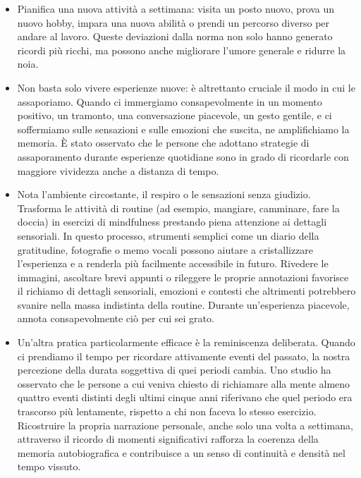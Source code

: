 \documentclass[12pt]{book} %
\begin{document}
\begin{itemize}
\item Pianifica una nuova attività a settimana: visita un posto nuovo, prova un nuovo hobby, impara una nuova abilità o prendi un percorso diverso per andare al lavoro. Queste deviazioni dalla norma non solo hanno generato ricordi più ricchi, ma possono anche migliorare l’umore generale e ridurre la noia.
\item Non basta solo vivere esperienze nuove: è altrettanto cruciale il modo in cui le assaporiamo. Quando ci immergiamo consapevolmente in un momento positivo, un tramonto, una conversazione piacevole, un gesto gentile, e ci soffermiamo sulle sensazioni e sulle emozioni che suscita, ne amplifichiamo la memoria. È stato osservato che le persone che adottano strategie di assaporamento durante esperienze quotidiane sono in grado di ricordarle con maggiore vividezza anche a distanza di tempo. 
\item Nota l'ambiente circostante, il respiro o le sensazioni senza giudizio. Trasforma le attività di routine (ad esempio, mangiare, camminare, fare la doccia) in esercizi di mindfulness prestando piena attenzione ai dettagli sensoriali. In questo processo, strumenti semplici come un diario della gratitudine, fotografie o memo vocali possono aiutare a cristallizzare l’esperienza e a renderla più facilmente accessibile in futuro. Rivedere le immagini, ascoltare brevi appunti o rileggere le proprie annotazioni favorisce il richiamo di dettagli sensoriali, emozioni e contesti che altrimenti potrebbero svanire nella massa indistinta della routine. Durante un'esperienza piacevole, annota consapevolmente ciò per cui sei grato.
\item Un’altra pratica particolarmente efficace è la reminiscenza deliberata. Quando ci prendiamo il tempo per ricordare attivamente eventi del passato, la nostra percezione della durata soggettiva di quei periodi cambia. Uno studio ha osservato che le persone a cui veniva chiesto di richiamare alla mente almeno quattro eventi distinti degli ultimi cinque anni riferivano che quel periodo era trascorso più lentamente, rispetto a chi non faceva lo stesso esercizio. Ricostruire la propria narrazione personale, anche solo una volta a settimana, attraverso il ricordo di momenti significativi rafforza la coerenza della memoria autobiografica e contribuisce a un senso di continuità e densità nel tempo vissuto.

\end{itemize}
\end{document}

